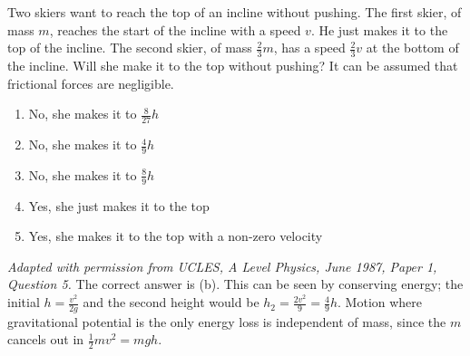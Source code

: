 
\begin{problem}[A1987PIQ5a] %
{Two skiers want to reach the top of an incline without pushing. The first skier, of mass $m$, reaches the start of the incline with a speed $v$. He just makes it to the top of the incline. The second skier, of mass $\frac{2}{3} m$, has a speed $\frac{2}{3}v$ at the bottom of the incline. Will she make it to the top without pushing? It can be assumed that frictional forces are negligible.
\begin{enumerate}
	\item No, she makes it to $\frac{8}{27}h$ 
	\item No, she makes it to $\frac{4}{9}h$ \answer
	\item No, she makes it to $\frac{8}{9}h$
	\item Yes, she just makes it to the top
	\item Yes, she makes it to the top with a non-zero velocity
\end{enumerate}
}
{\textit{Adapted with permission from UCLES, A Level Physics, June 1987, Paper 1, Question 5.}}
{The correct answer is (b). This can be seen by conserving energy; the initial $h = \frac{v^{2}}{2g}$ and the second height would be %
$h_{2} = \frac{2v^{2}}{9} = \frac{4}{9}h$.
 Motion where gravitational potential is the only energy loss is independent of mass, since the $m$ cancels out in $\frac{1}{2}mv^{2} = mgh$.
}
\end{problem}
